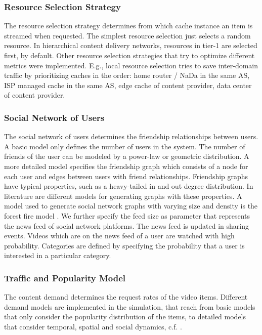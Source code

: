 \subsubsection{Resource Selection Strategy}
The resource selection strategy determines from which cache instance an item is streamed when requested.
The simplest resource selection just selects a random resource.
In hierarchical content delivery networks, resources in tier-1 are selected first, by default.
Other resource selection strategies that try to optimize different metrics were implemented.
E.g., local resource selection tries to save inter-domain traffic by prioritizing caches in the order: home router / NaDa in the same AS, ISP managed cache in the same AS, edge cache of content provider, data center of content provider.

\subsubsection{Social Network of Users}
The social network of users determines the friendship relationships between users. A basic model only defines the number of users in the system.
The number of friends of the user can be modeled by a power-law or geometric distribution.
A more detailed model specifies the friendship graph which consists of a node for each user and edges between users with friend relationships.
Friendship graphs have typical properties, such as a heavy-tailed in and out degree distribution.
In literature are different models for generating graphs with these properties.
A model used to generate social network graphs with varying size and density is the forest fire model \cite{leskovec2005graphs}.
We further specify the feed size as parameter that represents the news feed of social network platforms.
The news feed is updated in sharing events.
Videos which are on the news feed of a user are watched with high probability.
Categories are defined by specifying the probability that a user is interested in a particular category.

\subsubsection{Traffic and Popularity Model}
The content demand determines the request rates of the video items.
Different demand models are implemented in the simulation, that reach from basic models that only consider the popularity distribution of the items, to detailed models that consider temporal, spatial and social dynamics, c.f. .

